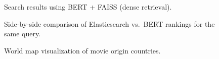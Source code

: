 \documentclass[11pt,a4paper]{article}
\begin{document}
\begin{figure}[H]
\centering
{}
\caption{Search results using BERT + FAISS (dense retrieval).}
\label{fig:screenshot-bert}
\end{figure}

\begin{figure}[H]
\centering
{}
\caption{Side-by-side comparison of Elasticsearch vs.\ BERT rankings for the same query.}
\label{fig:screenshot-compare}
\end{figure}

\begin{figure}[H]
\centering
{}
\caption{World map visualization of movie origin countries.}
\label{fig:screenshot-map}
\end{figure}

\end{document}
